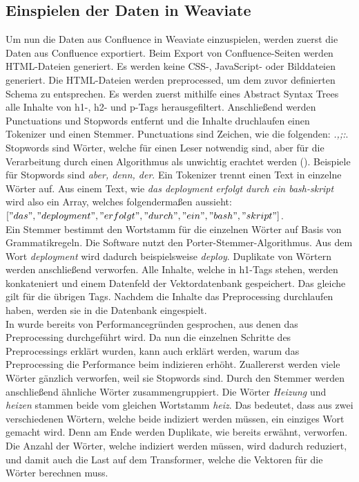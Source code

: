 \subsection{Einspielen der Daten in Weaviate}
\label{chap:einspielen-der-daten-in-weaviate}
Um nun die Daten aus Confluence in Weaviate einzuspielen, werden zuerst die Daten aus Confluence exportiert.
Beim Export von Confluence-Seiten werden HTML-Dateien generiert.
Es werden keine CSS-, JavaScript- oder Bilddateien generiert.
Die HTML-Dateien werden preprocessed, um dem zuvor definierten Schema zu entsprechen.
Es werden zuerst mithilfe eines Abstract Syntax Trees alle Inhalte von h1-, h2- und p-Tags herausgefiltert.
Anschließend werden Punctuations und Stopwords entfernt und die Inhalte druchlaufen einen Tokenizer und einen Stemmer.
Punctuations sind Zeichen, wie die folgenden: \textit{.,;:}.
Stopwords sind Wörter, welche für einen Leser notwendig sind, aber für die Verarbeitung durch einen Algorithmus als unwichtig erachtet werden (\cite{Sarica_Luo_2021}).
Beispiele für Stopwords sind \textit{aber, denn, der}.
Ein Tokenizer trennt einen Text in einzelne Wörter auf.
Aus einem Text, wie \textit{das deployment erfolgt durch ein bash-skript} wird also ein Array, welches folgendermaßen aussieht:\\

\(["das", "deployment", "erfolgt", "durch", "ein", "bash", "skript"]\).\\

Ein Stemmer bestimmt den Wortstamm für die einzelnen Wörter auf Basis von Grammatikregeln.
Die Software nutzt den Porter-Stemmer-Algorithmus.
Aus dem Wort \textit{deployment} wird dadurch beispielsweise \textit{deploy}.
Duplikate von Wörtern werden anschließend verworfen.
Alle Inhalte, welche in h1-Tags stehen, werden konkateniert und einem Datenfeld der Vektordatenbank gespeichert.
Das gleiche gilt für die übrigen Tags.
Nachdem die Inhalte das Preprocessing durchlaufen haben, werden sie in die Datenbank eingespielt.\\

In  wurde bereits von Performancegründen gesprochen, aus denen das Preprocessing durchgeführt wird.
Da nun die einzelnen Schritte des Preprocessings erklärt wurden, kann auch erklärt werden, warum das Preprocessing die Performance beim indizieren erhöht.
Zuallererst werden viele Wörter gänzlich verworfen, weil sie Stopwords sind.
Durch den Stemmer werden anschließend ähnliche Wörter zusammengruppiert.
Die Wörter \textit{Heizung} und \textit{heizen} stammen beide vom gleichen Wortstamm \textit{heiz}.
Das bedeutet, dass aus zwei verschiedenen Wörtern, welche beide indiziert werden müssen, ein einziges Wort gemacht wird.
Denn am Ende werden Duplikate, wie bereits erwähnt, verworfen.
Die Anzahl der Wörter, welche indiziert werden müssen, wird dadurch reduziert, und damit auch die Last auf dem Transformer, welche die Vektoren für die Wörter berechnen muss.



